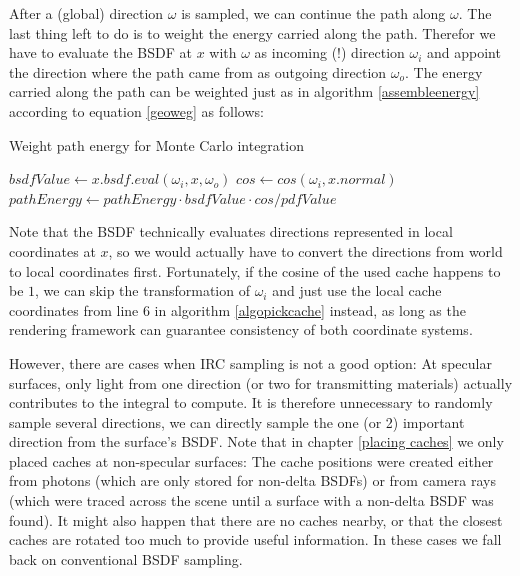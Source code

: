 After a (global) direction $\omega$ is sampled, we can continue the path along $\omega$. The last thing left to do is to weight the energy carried along the path. Therefor we have to evaluate the BSDF at $x$ with $\omega$ as incoming (!) direction $\omega_i$ and appoint the direction where the path came from as outgoing direction $\omega_o$. The energy carried along the path can be weighted just as in algorithm \ref{assembleenergy} according to equation \ref{geoweg} as follows:\\

\begin{algorithm}
\caption{Weight path energy for Monte Carlo integration}
\label{weight1}
\begin{algorithmic}
\State $bsdfValue \gets x.bsdf.eval(\omega_i,x,\omega_o)$
\State $cos \gets cos(\omega_i,x.normal)$
\State $pathEnergy \gets pathEnergy \cdot bsdfValue \cdot cos / pdfValue$
\end{algorithmic}
\end{algorithm}

Note that the BSDF technically evaluates directions represented in local coordinates at $x$, so we would actually have to convert the directions from world to local coordinates first. Fortunately, if the cosine of the used cache happens to be $1$, we can skip the transformation of $\omega_i$ and just use the local cache coordinates from line 6 in algorithm \ref{algopickcache} instead, as long as the rendering framework can guarantee consistency of both coordinate systems.

However, there are cases when IRC sampling is not a good option: At specular surfaces, only light from one direction (or two for transmitting materials) actually contributes to the integral to compute. It is therefore unnecessary to randomly sample several directions, we can directly sample the one (or 2) important direction from the surface's BSDF. Note that in chapter \ref{placing caches} we only placed caches at non-specular surfaces: The cache positions were created either from photons (which are only stored for non-delta BSDFs) or from camera rays (which were traced across the scene until a surface with a non-delta BSDF was found).\newline
It might also happen that there are no caches nearby, or that the closest caches are rotated too much to provide useful information. In these cases we fall back on conventional BSDF sampling. 




\newpage
